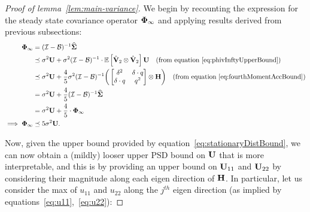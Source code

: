 \begin{proof}
[Proof of lemma~\ref{lem:main-variance}]
We begin by recounting the expression for the steady state covariance operator $\boldsymbol{\Phi}_{\infty}$ and applying results derived from previous subsections:
\begin{align}
\label{eq:stationaryDistBound}
\boldsymbol{\Phi}_{\infty}&=(\mathcal{I}-\mathcal{B})^{-1}\mathbf{\widehat{\Sigma}}\nonumber\\
&\preceq\sigma^2\mathbf{U}+\sigma^2(\mathcal{I}-\mathcal{B})^{-1}\cdot\mathbb{E}\left[\hat{\mathbf{V}}_2\otimes\hat{\mathbf{V}}_2\right]\mathbf{U}\quad(\text{from equation}~\ref{eq:phivInftyUpperBound})\nonumber\\
&\preceq\sigma^2\mathbf{U}+\frac{4}{5}\sigma^2(\mathcal{I}-\mathcal{B})^{-1}\bigg(\begin{bmatrix}\delta^2&\delta\cdot q \\\delta\cdot q &q ^2\end{bmatrix}\otimes\mathbf{H}\bigg)\quad(\text{from equation}~\ref{eq:fourthMomentAccBound})\nonumber\\
&=\sigma^2\mathbf{U}+\frac{4}{5}(\mathcal{I}-\mathcal{B})^{-1}\mathbf{\widehat{\Sigma}}\nonumber\\
&=\sigma^2\mathbf{U}+\frac{4}{5}\cdot\boldsymbol{\Phi}_{\infty}\nonumber\\
\implies\boldsymbol{\Phi}_{\infty}&\preceq5\sigma^2\mathbf{U}.
\end{align}
\iffalse
\begin{align}
\label{eq:stationaryDistBound}
\phiv_\infty&=(\eyeT-\BT)^{-1}\Sigh \preceq \sigma^2 (\eyeT-\BT)^{-1} \left(\begin{bmatrix}\delta^2&\delta\cdot \g \\\delta\cdot \g &\g ^2\end{bmatrix}\otimes\Cov\right) \nonumber\\
&=\sigma^2 \sum_{k=0}^{\infty}\bigg(\big(\eyeT-\V_1\otimes\V_1 - \V_1\otimes\V_2 - \V_2\otimes\V_1\big)^{-1}\E{\Vh_2\otimes\Vh_2}\bigg)^k\cdot \nonumber\\ &\qquad \qquad \quad \big(\eyeT-\V_1\otimes\V_1 - \V_1\otimes\V_2 - \V_2\otimes\V_1\big)^{-1}\left(\begin{bmatrix}\delta^2&\delta\cdot \g \\\delta\cdot \g &\g ^2\end{bmatrix}\otimes\Cov\right)\nonumber\\
&\preceq\sigma^2\bigg(\sum_{k=0}^{\infty} (4/5)^{-k}\bigg)\cdot\U=5\sigma^2 \U.
\end{align}
\fi
Now, given the upper bound provided by equation~\ref{eq:stationaryDistBound}, we can now obtain a (mildly) looser upper PSD bound on $\mathbf{U}$ that is more interpretable, and this is by providing an upper bound on $\mathbf{U}_{11}$ and $\mathbf{U}_{22}$ by considering their magnitude along each eigen direction of $\mathbf{H}$. In particular, let us consider the max of $u_{11}$ and $u_{22}$ along the $j^{th}$ eigen direction (as implied by equations~\ref{eq:u11},~\ref{eq:u22}):

\end{proof}

